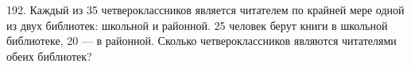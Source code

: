 192. Каждый из 35 четвероклассников является читателем по крайней мере одной из двух библиотек: школьной и районной. 25 человек берут книги в школьной библиотеке, 20 --- в районной. Сколько четвероклассников являются читателями обеих библиотек?\\
